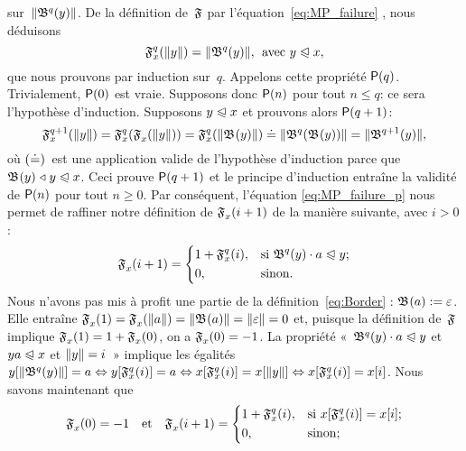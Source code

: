 sur~\(\lVert{\mathfrak{B}^{q}(y)}\rVert{}\). De la définition de~\(\mathfrak{F}\)
par l'équation~\eqref{eq:MP_failure} , nous
déduisons
\begin{equation}
\mathfrak{F}_{x}^{q}(\lVert{y}\rVert{}) = \lVert{\mathfrak{B}^{q}(y)}\rVert{},
\,\; \text{avec \(y \mathrel{\trianglelefteqslant}x\)},
\label{eq:MP_failure_p}
\end{equation}
que nous prouvons par induction sur~\(q\). Appelons cette propriété
\(\textsf{P}({q})\). Trivialement, \(\textsf{P}({0})\) est vraie. Supposons
donc \(\textsf{P}({n})\) pour tout \(n \leqslant q\): ce sera l'hypothèse
d'induction. Supposons \(y \mathrel{\trianglelefteqslant} x\) et prouvons alors
\(\textsf{P}({q+1})\):
\begin{equation*}
  \mathfrak{F}_{x}^{q+1}(\lVert{y}\rVert{})
= \mathfrak{F}_{x}^{q}(\mathfrak{F}_{x}^{}(\lVert{y}\rVert{}))
= \mathfrak{F}_{x}^{q}(\lVert{\mathfrak{B}^{}(y)}\rVert{})
\doteq \lVert{\mathfrak{B}^{q}(\mathfrak{B}^{}(y))}\rVert{}
= \lVert{\mathfrak{B}^{q+1}(y)}\rVert{},
\end{equation*}
où \((\smash{\doteq})\)~est une application valide de l'hypothèse
d'induction parce que \(\mathfrak{B}^{}(y) \mathrel{\triangleleft} y \mathrel{\trianglelefteqslant} x\). Ceci prouve
\(\textsf{P}({q+1})\) et le principe d'induction entraîne la validité de
\(\textsf{P}({n})\) pour tout \(n \geqslant 0\). Par conséquent,
l'équation \eqref{eq:MP_failure_p} nous permet de raffiner notre
définition de \(\mathfrak{F}_{x}^{}(i+1)\) de la manière suivante, avec
\(i>0\):
\begin{equation*}
\mathfrak{F}_{x}^{}(i+1) =
\left\{
  \begin{aligned}
   & 1 + \mathfrak{F}_{x}^{q}(i),
   && \text{si \(\mathfrak{B}^{q}(y) \cdot a \mathrel{\trianglelefteqslant}y\)};\\
   & 0,
   && \text{sinon.}
  \end{aligned}
\right.
\end{equation*}
Nous n'avons pas mis à profit une partie de la
définition~\eqref{eq:Border} : \({\mathfrak{B}^{}(a) :=
  \varepsilon}\). Elle entraîne \(\mathfrak{F}_{x}^{}(1) =
\mathfrak{F}_{x}^{}(\lVert{a}\rVert{}) = \lVert{\mathfrak{B}^{}(a)}\rVert{} = \lVert{\varepsilon}\rVert{} =
0\) et, puisque la définition de~\(\mathfrak{F}\) implique
\(\mathfrak{F}_{x}^{}(1) = 1 + \mathfrak{F}_{x}^{}(0)\), on a
\(\mathfrak{F}_{x}^{}(0) = -1\). La propriété «~\(\mathfrak{B}^{q}(y) \cdot a
\mathrel{\trianglelefteqslant} y\) et \({ya \mathrel{\trianglelefteqslant} x}\) et \({\lVert{y}\rVert{} = i}\)~» implique les
égalités \(\smash{{y}[{\lVert{\mathfrak{B}^{q}(y)}\rVert{}}]} = a \Leftrightarrow
\smash{{y}[{\mathfrak{F}_{x}^{q}(i)}]} = a \Leftrightarrow
\smash{{x}[{\mathfrak{F}_{x}^{q}(i)}]} = \smash{{x}[{\lVert{y}\rVert{}}]}
\Leftrightarrow \smash{{x}[{\mathfrak{F}_{x}^{q}(i)}]} =
{x}[{i}]\). Nous savons maintenant que
\begin{equation*}
 \mathfrak{F}_{x}^{}(0)   = -1\quad\text{et}\quad
 \mathfrak{F}_{x}^{}(i+1) =
   \left\{
     \begin{aligned}
       & 1 + \mathfrak{F}_{x}^{q}(i),
       && \text{si \({x}[{\mathfrak{F}_{x}^{q}(i)}] = {x}[{i}]\)};\\
       & 0,
       && \text{sinon;}
     \end{aligned}
   \right.
\end{equation*}
